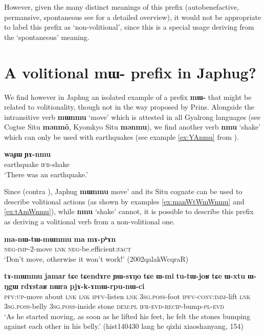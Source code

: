 \documentclass[oneside,a4paper,11pt]{article}
\newcommand{\ipa}[1]{\textbf{{\phon\mbox{#1}}}} %
\begin{document}
 However, given the many distinct meanings of this prefix (autobenefactive,  permansive, spontaneous see \citet{jacques15spontaneous} for a detailed overview), it would not be appropriate to label this prefix as `non-volitional', since this is a special usage deriving from the `spontaneous' meaning.

\section{A volitional \ipa{mɯ-} prefix in Japhug?}
We find however in Japhug an isolated example of a prefix \ipa{mɯ-} that might be related to volitionality, though not in the way proposed by Prins. Alongside the intransitive verb \ipa{mɯnmu} `move' which is attested in all Gyalrong languages (see Cogtse Situ \ipa{mənmō}, Kyomkyo Situ \ipa{mənmu}), we find another verb \ipa{nmu} `shake' which can only be used with earthquakes (see example \ref{ex:YAnmu} from \citealt{jacques16japhug}).

\begin{exe}
\ex \label{ex:YAnmu}
\gll
\ipa{waɟɯ} \ipa{ɲɤ-nmu} \\
earthquake \textsc{ifr}-shake \\
\glt `There was an earthquake.'
\end{exe}

Since (contra \citealt[505]{prins16kyomkyo}), Japhug \ipa{mɯnmu}  move' and its Situ cognate can be used to describe volitional actions (as shown by examples  \ref{ex:manWtWmWnmu} and \ref{ex:tAmWnmu}), while \ipa{nmu} `shake' cannot, it is possible to describe this prefix as deriving a volitional verb from a non-volitional one. 

\begin{exe}
\ex \label{ex:manWtWmWnmu}
\gll  \ipa{ma-nɯ-tɯ-mɯnmu} \ipa{ma} \ipa{mɤ-pʰɤn} \\
\textsc{neg-imp}-2-move \textsc{lnk} \textsc{neg}-be.efficient:\textsc{fact} \\
\glt `Don't move, otherwise it won't work!' (2002qalakWcqraR)
\end{exe}

\begin{exe}
\ex \label{ex:tAmWnmu}
\gll 
\ipa{tɤ-mɯnmu} \ipa{jamar} 	\ipa{tɕe} 	\ipa{tɕendɤre} 	\ipa{ɲɯ-sɤŋo} 	\ipa{tɕe} 	\ipa{ɯ-mi} 	\ipa{tu-tɯ-joʁ} 	\ipa{tɕe} 	\ipa{ɯ-xtu} 	\ipa{ɯ-ŋgɯ} 	\ipa{rdɤstaʁ} 	\ipa{nɯra} 	\ipa{pjɤ-k-ɤmɯ-rpu-nɯ-ci} \\
\textsc{pfv:up}-move about \textsc{lnk} \textsc{lnk} \textsc{ipfv}-listen \textsc{lnk} \textsc{3sg.poss}-foot \textsc{ipfv-conv:imm}-lift \textsc{lnk} \textsc{3sg.poss}-belly \textsc{3sg.poss}-inside stone \textsc{dem:pl} \textsc{ifr-evd-recip}-bump-\textsc{pl-evd} \\
\glt `As he started moving, as soon as he lifted his feet, he felt the stones bumping against each other in his belly.' (hist140430 lang he qizhi xiaoshanyang, 154)
\end{exe}
\end{document}
